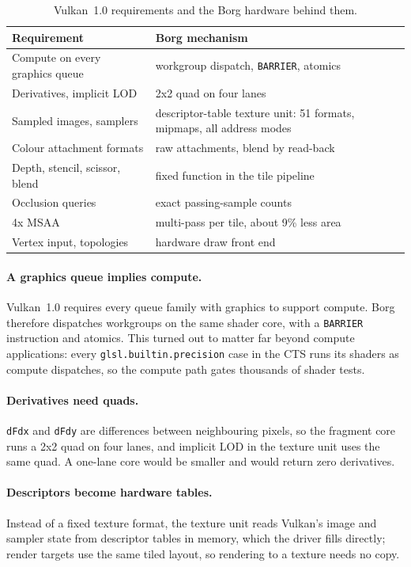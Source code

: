 \documentclass[sigconf,nonacm]{acmart}
\begin{document}
\begin{table}[t]
  \caption{Vulkan~1.0 requirements and the Borg hardware behind them.}
  \label{tab:features}
  \small
  \begin{tabular}{p{}p{}}
    \toprule
    Requirement & Borg mechanism \\
    \midrule
    Compute on every graphics queue & workgroup dispatch, \texttt{BARRIER}, atomics \\
    Derivatives, implicit LOD & 2x2 quad on four lanes \\
    Sampled images, samplers & descriptor-table texture unit: 51 formats, mipmaps, all address modes \\
    Colour attachment formats & raw attachments, blend by read-back \\
    Depth, stencil, scissor, blend & fixed function in the tile pipeline \\
    Occlusion queries & exact passing-sample counts \\
    4x MSAA & multi-pass per tile, about 9\% less area \\
    Vertex input, topologies & hardware draw front end \\
    \bottomrule
  \end{tabular}
\end{table}

\paragraph{A graphics queue implies compute.}
Vulkan~1.0 requires every queue family with graphics to support compute.
Borg therefore dispatches workgroups on the same shader core, with a
\texttt{BARRIER} instruction and atomics. This turned out to matter far
beyond compute applications: every \texttt{glsl.builtin.precision} case in
the CTS runs its shaders as compute dispatches, so the compute path gates
thousands of shader tests.

\paragraph{Derivatives need quads.}
\texttt{dFdx} and \texttt{dFdy} are differences between neighbouring
pixels, so the fragment core runs a 2x2 quad on four lanes, and implicit
LOD in the texture unit uses the same quad. A one-lane core would be
smaller and would return zero derivatives.

\paragraph{Descriptors become hardware tables.}
Instead of a fixed texture format, the texture unit reads Vulkan's image
and sampler state from descriptor tables in memory, which the driver fills
directly; render targets use the same tiled layout, so rendering to a
texture needs no copy.
\end{document}
